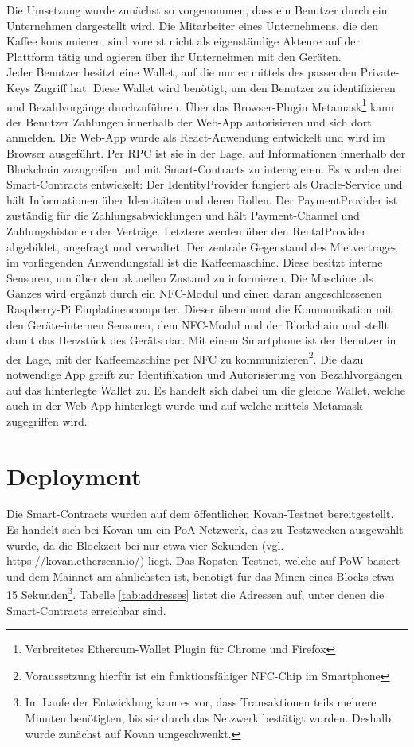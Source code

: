 Die Umsetzung wurde zunächst so vorgenommen, dass ein Benutzer durch ein Unternehmen dargestellt wird. Die Mitarbeiter eines Unternehmens, die den Kaffee konsumieren, sind vorerst nicht als eigenständige Akteure auf der Plattform tätig und agieren über ihr Unternehmen mit den Geräten.\\
Jeder Benutzer besitzt eine Wallet, auf die nur er mittels des passenden Private-Keys Zugriff hat. Diese Wallet wird benötigt, um den Benutzer zu identifizieren und Bezahlvorgänge durchzuführen. Über das Browser-Plugin Metamask\footnote{Verbreitetes Ethereum-Wallet Plugin für Chrome und Firefox} kann der Benutzer Zahlungen innerhalb der Web-App autorisieren und sich dort anmelden. Die Web-App wurde als React-Anwendung entwickelt und wird im Browser ausgeführt. Per \ac{RPC} ist sie in der Lage, auf Informationen innerhalb der Blockchain zuzugreifen und mit Smart-Contracts zu interagieren. Es wurden drei Smart-Contracts entwickelt: Der IdentityProvider fungiert als Oracle-Service und hält Informationen über Identitäten und deren Rollen. Der PaymentProvider ist zuständig für die Zahlungsabwicklungen und hält Payment-Channel und Zahlungshistorien der Verträge. Letztere werden über den RentalProvider abgebildet, angefragt und verwaltet. Der zentrale Gegenstand des Mietvertrages im vorliegenden Anwendungsfall ist die Kaffeemaschine. Diese besitzt interne Sensoren, um über den aktuellen Zustand zu informieren. Die Maschine als Ganzes wird ergänzt durch ein NFC-Modul und einen daran angeschlossenen Raspberry-Pi Einplatinencomputer. Dieser übernimmt die Kommunikation mit den Geräte-internen Sensoren, dem NFC-Modul und der Blockchain und stellt damit das Herzstück des Geräts dar. Mit einem Smartphone ist der Benutzer in der Lage, mit der Kaffeemaschine per \ac{NFC} zu kommunizieren\footnote{Voraussetzung hierfür ist ein funktionsfähiger NFC-Chip im Smartphone}. Die dazu notwendige App greift zur Identifikation und Autorisierung von Bezahlvorgängen auf das hinterlegte Wallet zu. Es handelt sich dabei um die gleiche Wallet, welche auch in der Web-App hinterlegt wurde und auf welche mittels Metamask zugegriffen wird.

\section{Deployment}
\label{sec:implementation:poc:deployment}
Die Smart-Contracts wurden auf dem öffentlichen Kovan-Testnet bereitgestellt. Es handelt sich bei Kovan um ein \ac{PoA}-Netzwerk, das zu Testzwecken ausgewählt wurde, da die Blockzeit bei nur etwa vier Sekunden (vgl. \url{https://kovan.etherscan.io/}) liegt. Das Ropsten-Testnet, welche auf \ac{PoW} basiert und dem Mainnet am ähnlichsten ist, benötigt für das Minen eines Blocks etwa 15 Sekunden\footnote{Im Laufe der Entwicklung kam es vor, dass Transaktionen teils mehrere Minuten benötigten, bis sie durch das Netzwerk bestätigt wurden. Deshalb wurde zunächst auf Kovan umgeschwenkt.}. Tabelle \ref{tab:addresses} listet die Adressen auf, unter denen die Smart-Contracts erreichbar sind.

